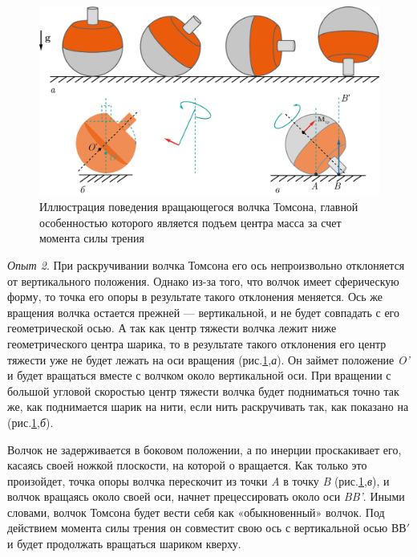 					\begin{figure}[H] 	
						\centering 	
						\includegraphics[width=0.9\linewidth]{gyro-7.png}
						\caption{Иллюстрация поведения вращающегося волчка Томсона, главной особенностью которого является подъем центра масса за счет момента силы трения}
						\label{gyro-7}
					\end{figure}
								
			\textit{Опыт 2}. При раскручивании волчка Томсона его ось непроизвольно отклоняется от вертикального положения.
			Однако из-за того, что волчок имеет сферическую форму, то точка его опоры в результате такого отклонения меняется.
			Ось же вращения волчка остается прежней — вертикальной, и не будет совпадать с его геометрической осью. 
			А так как центр тяжести волчка лежит ниже геометрического центра шарика, то в результате такого отклонения его центр тяжести уже не будет лежать на оси вращения (рис.\ref{gyro-7},\textit{а}).
			Он займет положение \textit{O'} и будет вращаться вместе с волчком около вертикальной оси.
			При вращении с большой угловой скоростью центр тяжести волчка будет подниматься точно так же, как поднимается шарик на нити, если нить раскручивать так, как показано на (рис.\ref{gyro-7},\textit{б}).	
			
					
			Волчок не задерживается в боковом положении, а по инерции проскакивает его, касаясь своей ножкой плоскости, на которой о вращается.
			Как только это произойдет, точка опоры волчка перескочит из точки  \textit{A} в точку  \textit{B} (рис.\ref{gyro-7},\textit{в}), и волчок вращаясь около своей оси, начнет прецессировать около оси \textit{BB'}. 
			Иными словами, волчок Томсона будет вести себя как «обыкновенный» волчок. 
			Под действием момента силы трения он совместит свою ось с вертикальной осью $ \text{ВВ}' $ и будет продолжать вращаться шариком кверху. 
			
